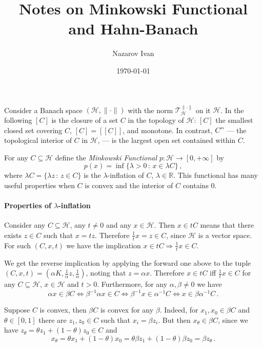 \documentclass[a4paper]{article}
\title{Notes on Minkowski Functional and Hahn-Banach}
\author{Nazarov Ivan}
\date{\today}
\newcommand{\Hcal}{\mathcal{H}}
\newcommand{\real}{\mathbb{R}}
\newcommand{\interior}[1]{%
  {\kern0pt#1}^{\mathrm{o}}%
}
\newcommand{\Tcal}{\mathcal{T}}
\begin{document}
\maketitle

Consider a Banach space $(\Hcal, \|\cdot\|)$ with the norm $\Tcal^{\|\cdot\|}_\Hcal$
on it $\Hcal$. In the following $[C]$ is the closure of a set $C$ in the topology
of $\Hcal$: $[C]$ the smallest closed set covering $C$, $[C] = [[C]]$, and monotone.
In contrast, $\interior{C}$ --- the topological interior of $C$ in $\Hcal$, --- is
the largest open set contained within $C$.

For any $C \subseteq \Hcal$ define the {\it Minkowski Functional} $p\colon \Hcal \to
[0, +\infty]$ by
\begin{equation*}
  p(x)
    = \inf \bigl\{ \lambda > 0\,:\, x \in \lambda C\bigr\}
    \,,
\end{equation*}
where $\lambda C = \{\lambda z \,:\, z\in C\}$ is the $\lambda$-inflation of $C$,
$\lambda \in\real$. This functional has many useful properties when $C$ is convex
and the interior of $C$ contains $0$.

\paragraph{Properties of $\lambda$-inflation} %
\label{par:properties_of_lambda_inflation}

Consider any $C\subseteq \Hcal$, any $t \neq 0$ and any $x\in \Hcal$. Then $x\in t C$
means that there exists $z \in C$ such that $x = t z$. Therefore $\tfrac1t x = z
\in C$, since $\Hcal$ is a vector space. For such $(C, x, t)$ we have the implication
$x \in t C \Rightarrow \tfrac1t x \in C$.

We get the reverse implication by applying the forward one above to the tuple $(C, x, t)
= (\alpha K, \tfrac1\alpha z, \tfrac1\alpha)$, noting that $z = \alpha x$. Therefore
$x\in t C$ iff $\tfrac1t x \in C$ for any $C\subseteq \Hcal$, $x\in \Hcal$ and $t > 0$.
Furthermore, for any $\alpha, \beta \neq 0$ we have
\begin{equation*}
  \alpha x \in \beta C \Leftrightarrow
  \beta^{-1} \alpha x \in C \Leftrightarrow
  \beta^{-1} x \in \alpha^{-1} C \Leftrightarrow
  x \in \beta \alpha^{-1} C
  \,.
\end{equation*}

Suppose $C$ is convex, then $\beta C$ is convex for any $\beta$. Indeed, for $x_1,
x_0 \in \beta C$ and $\theta\in [0, 1]$ there are $z_1, z_0 \in C$ such that $x_i
= \beta z_i$. But then $x_\theta \in \beta C$, since we have $z_\theta = \theta z_1
+ (1-\theta) z_0 \in C$ and
\begin{equation*}
  x_\theta
  = \theta x_1 + (1-\theta) x_0
  = \theta \beta z_1 + (1-\theta) \beta z_0
  = \beta z_\theta
  \,.
\end{equation*}
\end{document}

